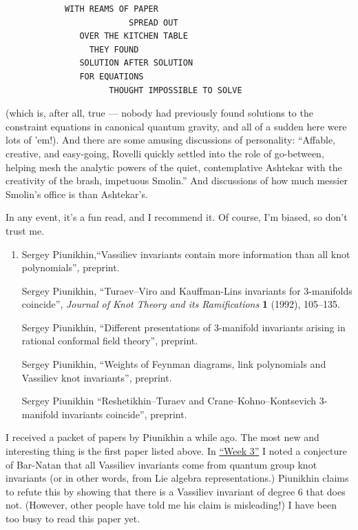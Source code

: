 \documentclass[12pt]{article}
\begin{document}
\begin{verbatim}
            WITH REAMS OF PAPER
                         SPREAD OUT
               OVER THE KITCHEN TABLE
                 THEY FOUND
               SOLUTION AFTER SOLUTION
               FOR EQUATIONS
                     THOUGHT IMPOSSIBLE TO SOLVE
\end{verbatim}
(which is, after all, true --- nobody had previously found solutions to
the constraint equations in canonical quantum gravity, and all of a
sudden here were lots of 'em!). And there are some amusing discussions
of personality: ``Affable, creative, and easy-going, Rovelli quickly
settled into the role of go-between, helping mesh the analytic powers of
the quiet, contemplative Ashtekar with the creativity of the brash,
impetuous Smolin.'' And discussions of how much messier Smolin's office
is than Ashtekar's.

In any event, it's a fun read, and I recommend it. Of course, I'm
biased, so don't trust me.

\begin{enumerate}
\def\labelenumi{\arabic{enumi})}
\setcounter{enumi}{1}
\item
   Sergey Piunikhin,``Vassiliev invariants contain more information than all knot
  polynomials'', preprint. 

  Sergey Piunikhin, ``Turaev--Viro and Kauffman-Lins invariants for 3-manifolds coincide'',
  \emph{Journal of Knot Theory and its
  Ramifications} \textbf{1} (1992), 105--135.

  Sergey Piunikhin, ``Different presentations of 3-manifold invariants arising in rational
  conformal field theory'', preprint.

   Sergey Piunikhin, ``Weights of Feynman diagrams, link polynomials and Vassiliev knot
  invariants'', preprint.

  Sergey Piunikhin ``Reshetikhin--Turaev and Crane--Kohno--Kontsevich 3-manifold invariants
  coincide'', preprint.
\end{enumerate}

I received a packet of papers by Piunikhin a while ago. The most new and
interesting thing is the first paper listed above. In
\protect\hyperlink{week3}{``Week 3''} I noted a conjecture of Bar-Natan
that all Vassiliev invariants come from quantum group knot invariants
(or in other words, from Lie algebra representations.) Piunikhin claims
to refute this by showing that there is a Vassiliev invariant of degree
6 that does not. (However, other people have told me his claim is
misleading!) I have been too busy to read this paper yet.
\end{document}
